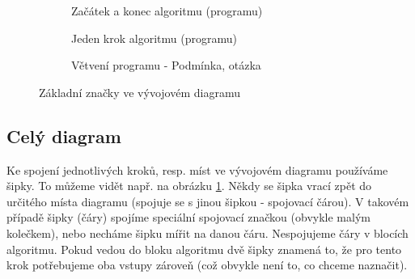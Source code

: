 \begin{figure}[h!]
\centering
\begin{subfigure}[t]{.3\textwidth}
\label{diagram:start_end}
\caption{Začátek a konec algoritmu (programu)}
\end{subfigure}
%
\begin{subfigure}[t]{.3\textwidth}
\label{diagram:step}
\caption{Jeden krok algoritmu (programu)}
\end{subfigure}
%
\begin{subfigure}[t]{.3\textwidth}
\label{diagram:decision}
\caption{Větvení programu - Podmínka, otázka}
\end{subfigure}
\label{diagram:zakladni}
\caption{Základní značky ve vývojovém diagramu}
\end{figure}

\subsection{Celý diagram}
Ke spojení jednotlivých kroků, resp. míst ve vývojovém diagramu používáme šipky. To můžeme vidět např. na obrázku \ref{diagram:start_end}. Někdy se šipka vrací zpět do určitého místa diagramu (spojuje se s jinou šipkou - spojovací čárou). V takovém případě šipky (čáry) spojíme speciální spojovací značkou (obvykle malým kolečkem), nebo necháme šipku mířit na danou čáru. Nespojujeme čáry v blocích algoritmu. Pokud vedou do bloku algoritmu dvě šipky znamená to, že pro tento krok potřebujeme oba vstupy zároveň (což obvykle není to, co chceme naznačit).

